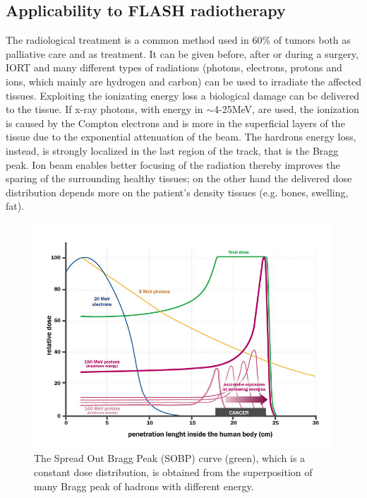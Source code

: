     \subsection{Applicability to FLASH radiotherapy}
        The radiological treatment is a common method used in 60\% of tumors both as palliative care and as treatment. It can be given before, after or during a surgery,  IORT and many different types of radiations (photons, electrons, protons and ions, which mainly are hydrogen and carbon) can be used to irradiate the affected tissues.
        Exploiting the ionizating energy loss a biological damage can be delivered to the tissue. 
        If x-ray photons, with energy in $\sim$4-25\si{MeV}, are used, the ionization is caused by the Compton electrons and is more in the superficial layers of the tissue due to the exponential attenuation of the beam. 
        The hardrons energy loss, instead, is strongly localized in the last region of the track, that is the Bragg peak. 
        Ion beam enables better focusing of the radiation thereby improves the sparing of the surrounding healthy tissues; on the other hand the delivered dose distribution depends more on the patient's density tissues (e.g. bones, swelling, fat).  

        \begin{figure}
            \centering
            \includegraphics[width=.7\linewidth]{figures/pixel_detectors_usage/Bragg-Peak.png}
            \caption{The Spread Out Bragg Peak (SOBP) curve (green), which is a constant dose distribution, is obtained from the superposition of many Bragg peak of hadrons with different energy.}
            \label{fig:Bragg-peak}
         \end{figure}

